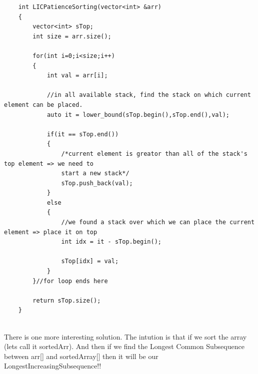 \begin{solution}
{      }

    \begin{verbatim}
    int LICPatienceSorting(vector<int> &arr)
    {
        vector<int> sTop; 
        int size = arr.size();
        
        for(int i=0;i<size;i++)
        {
            int val = arr[i];
            
            //in all available stack, find the stack on which current element can be placed. 
            auto it = lower_bound(sTop.begin(),sTop.end(),val); 

            if(it == sTop.end())
            {
                /*current element is greator than all of the stack's top element => we need to 
                start a new stack*/
                sTop.push_back(val);
            }
            else
            {
                //we found a stack over which we can place the current element => place it on top
                int idx = it - sTop.begin();
            
                sTop[idx] = val; 
            }
        }//for loop ends here
        
        return sTop.size();
    }
    
    \end{verbatim}

\end{solution}

\begin{solution}
    There is one more interesting solution.
    The intution is that if we sort the array (lets call it sortedArr). And then if we find the Longest Common Subsequence
    between arr[] and sortedArray[] then it will be our LongestIncreasingSubsequence!!
\end{solution}

